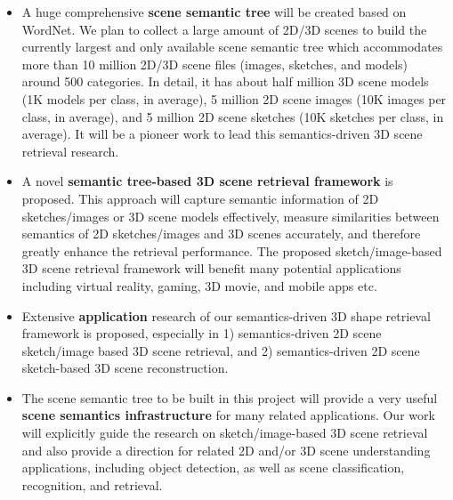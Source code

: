 \begin{itemize}

\item A huge comprehensive \textbf{scene semantic tree} will be created based on WordNet. We plan to collect a large amount of 2D/3D scenes to build the currently largest and only available scene semantic tree which accommodates  more than 10 million 2D/3D scene files (images, sketches, and models) around 500 categories. In detail, it has about half million 3D scene models (1K models per class, in average), 5 million 2D scene images (10K images per class, in average), and 5 million 2D scene sketches (10K sketches per class, in average). It will be a pioneer work to lead this semantics-driven 3D scene retrieval research. 

\item A novel \textbf{semantic tree-based 3D scene retrieval framework} is proposed. This approach will capture semantic information of 2D sketches/images or 3D scene models effectively, measure similarities between semantics of 2D sketches/images and 3D scenes accurately, and therefore greatly enhance the retrieval performance. The proposed sketch/image-based 3D scene retrieval framework will benefit many potential applications including virtual reality, gaming, 3D movie, and mobile apps etc. 


\item Extensive \textbf{application} research of our semantics-driven 3D shape retrieval framework is proposed, especially in 1) semantics-driven 2D scene sketch/image based 3D scene retrieval, and 2) semantics-driven 2D scene sketch-based 3D scene reconstruction. 


\item The scene semantic tree to be built in this project will provide a very useful \textbf{scene semantics infrastructure} for many related applications. Our work will explicitly guide the research on sketch/image-based 3D scene retrieval and also provide a direction for related 2D and/or 3D scene understanding applications, including object detection, as well as scene classification, recognition, and retrieval. 



\end{itemize}
